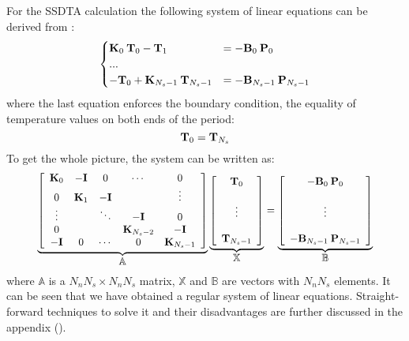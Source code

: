 For the SSDTA calculation the following system of linear equations can be
derived from :
\[
  \begin{cases}
    \mathbf{K}_0 \: \mathbf{T}_0 - \mathbf{T}_1 & = -\mathbf{B}_0 \: \mathbf{P}_0 \\
    ... \\
    -\mathbf{T}_0 + \mathbf{K}_{N_s - 1} \: \mathbf{T}_{N_s - 1} & = -\mathbf{B}_{N_s - 1} \: \mathbf{P}_{N_s - 1}
  \end{cases}
\]
where the last equation enforces the boundary condition, the equality of
temperature values on both ends of the period:
\begin{equation} \elab{boundary-condition}
  \v{T}_0 = \v{T}_{N_s}
\end{equation}
To get the whole picture, the system can be written as:
\begin{equation} \elab{system}
\resizebox{0.9\linewidth}{!}{
  $\underbrace{\left[
    \begin{array}{ccccc}
      \m{K}_0 & -\m{I} & 0 & \cdots & 0 \\
      0 & \m{K}_1 & -\m{I} &  & \vdots \\
      \vdots &  & \ddots & -\m{I} & 0 \\
      0 &  &  & \m{K}_{N_s - 2} & -\m{I} \\
      -\m{I} & 0 & \cdots & 0 & \m{K}_{N_s - 1}
    \end{array}
  \right]}_{\displaystyle \mathbb{A}} \underbrace{\left[
    \begin{array}{c}
      \v{T}_0 \\
      \\
      \vdots \\
      \\
      \v{T}_{N_s - 1}
    \end{array}
  \right]}_{\displaystyle \mathbb{X}} = \underbrace{\left[
    \begin{array}{c}
      -\m{B}_0 \: \v{P}_0 \\
      \\
      \vdots \\
      \\
      -\m{B}_{N_s - 1} \: \v{P}_{N_s - 1}
    \end{array}
  \right]}_{\displaystyle \mathbb{B}}$
}
\end{equation}
where $\mathbb{A}$ is a $N_n N_s \times N_n N_s$ matrix, $\mathbb{X}$ and
$\mathbb{B}$ are vectors with $N_n N_s$ elements. It can be seen that we have
obtained a regular system of linear equations. Straight-forward techniques to
solve it and their disadvantages are further discussed in the appendix
().

